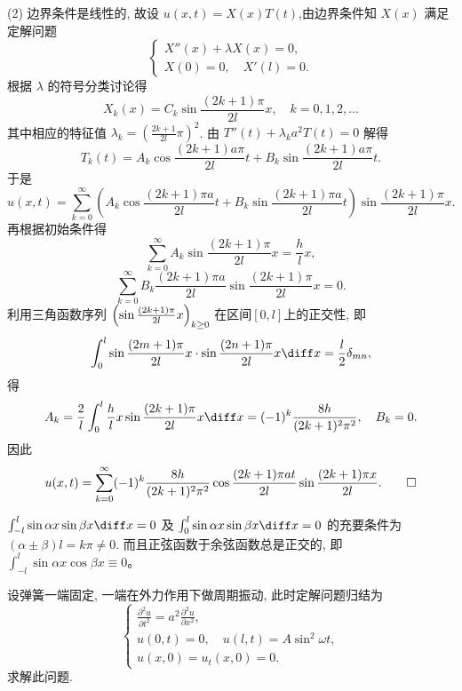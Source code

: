 \begin{solve}
  (2) 边界条件是线性的, 故设 $u(x,t)=X(x)T(t)$,由边界条件知 $X(x)$ 满足定解问题
  \[\begin{cases}
    X''(x)+\lambda X(x) = 0, \\
    X(0) = 0,\quad X'(l) = 0.
  \end{cases}\]
  根据 $\lambda$ 的符号分类讨论得
  \[X_k(x)=C_k\sin \frac{(2k+1)\pi}{2l}x,\quad k=0,1,2,\ldots\]
  其中相应的特征值 $\lambda_k=\left(\frac{2k+1}{2l}\pi\right)^2$.
  由 $T''(t)+\lambda_k a^2T(t)=0$ 解得
  \[T_k(t) = A_k\cos\frac{(2k+1)a\pi}{2l}t+B_k\sin \frac{(2k+1)a\pi}{2l}t.\]
  于是
  \[u(x,t) = \sum_{k=0}^{\infty}\left(A_k\cos\frac{(2k+1)\pi a}{2l}t
    + B_k\sin \frac{(2k+1)\pi a}{2l}t\right)\sin \frac{(2k+1)\pi}{2l}x.\]
  再根据初始条件得
  \[\sum_{k=0}^{\infty}A_k\sin \frac{(2k+1)\pi}{2l}x=\frac{h}{l}x,\]
  \[\sum_{k=0}^{\infty}B_k\frac{(2k+1)\pi a}{2l}\sin \frac{(2k+1)\pi}{2l}x = 0.\]
  利用三角函数序列 $\Bigl(\sin \frac{(2k+1)\pi}{2l}x\Bigr)_{k\geq 0}$
  在区间$[0,l]$上的正交性, 即
  \[\int_0^l\sin \frac{(2m+1)\pi}{2l}x\cdot\sin \frac{(2n+1)\pi}{2l}x\diff x
    = \frac{l}{2}\delta_{mn},\]
  得
  \[A_k=\frac{2}{l}\int_0^l\frac{h}{l}x\sin \frac{(2k+1)\pi}{2l}x\diff x
    =(-1)^k\frac{8h}{(2k+1)^2\pi^2},\quad B_k = 0.\]
  因此
  \[ u(x,t) = \sum_{k=0}^{\infty}(-1)^k\frac{8h}{(2k+1)^2\pi^2}\cos\frac{(2k+1)\pi at}{2l}
    \sin\frac{(2k+1)\pi x}{2l}. \qedhere \]
\end{solve}

\begin{remark}
  $\int_{-l}^l\sin\alpha x\sin\beta x\diff x=0$ 及 $\int_0^l\sin\alpha x\sin\beta x\diff x=0$
  的充要条件为 $(\alpha\pm\beta)l=k\pi\neq 0$. 而且正弦函数于余弦函数总是正交的, 
  即 $\int_{-l}^l\sin\alpha x\cos\beta x\equiv 0$。
\end{remark}


\begin{exercise}
  设弹簧一端固定, 一端在外力作用下做周期振动, 此时定解问题归结为
  \[\begin{cases}
    \frac{\partial^2u}{\partial t^2} = a^2 \frac{\partial^2u}{\partial x^2}, \\
    u(0,t) = 0, \quad u(l,t) = A\sin^2\omega t, \\
    u(x,0) = u_t(x,0) = 0.
  \end{cases}\]
  求解此问题.
\end{exercise}

